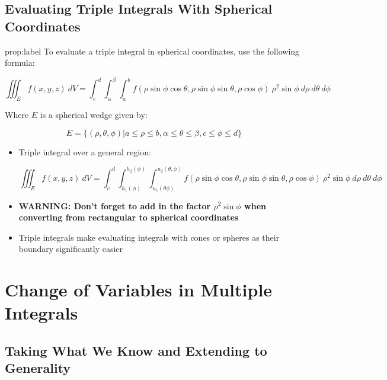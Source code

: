 \documentclass{package/notes}
\begin{document}
\subsection{Evaluating Triple Integrals With Spherical Coordinates}

\begin{proposition}{prop:label}
	To evaluate a triple integral in spherical coordinates, use the following formula:

	$$\iiint_Ef(x,y,z)\:dV=\int_c^d\int_\alpha^\beta\int_a^bf(\rho\sin\phi\cos\theta,\rho\sin\phi\sin\theta,\rho\cos\phi)\:\rho^2\sin\phi\:d\rho\:d\theta\:d\phi$$

	Where $E$ is a spherical wedge given by:

	$$E = \{(\rho,\theta,\phi)|a\le\rho\le b, \alpha\le\theta\le\beta,c\le\phi\le d\}$$
\end{proposition}

\begin{itemize}
	\item Triple integral over a general region: 
	
	$$\iiint_Ef(x,y,z)\:dV=\int_c^d\int_{h_1(\phi)}^{h_2(\phi)}\int_{u_1(\theta\phi)}^{u_2(\theta,\phi)}f(\rho\sin\phi\cos\theta,\rho\sin\phi\sin\theta,\rho\cos\phi)\:\rho^2\sin\phi\:d\rho\:d\theta\:d\phi$$

	\item \textbf{WARNING: Don't forget to add in the factor $\rho^2\sin\phi$ when converting from rectangular to spherical coordinates}
	\item Triple integrals make evaluating integrals with cones or spheres as their boundary significantly easier
\end{itemize}




\section{Change of Variables in Multiple Integrals}


\subsection{Taking What We Know and Extending to Generality}
\end{document}
